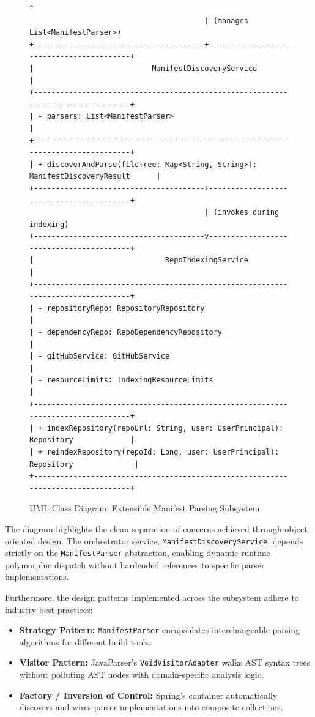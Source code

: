 \documentclass[11pt,a4paper,openany]{report}
\begin{document}
\begin{figure}[htbp]
\begin{lstlisting}[style=asciistyle, rulecolor=\color{secondary}]
                                        ^
                                        | (manages List<ManifestParser>)
+---------------------------------------+-----------------------------------------+
|                           ManifestDiscoveryService                              |
+---------------------------------------------------------------------------------+
| - parsers: List<ManifestParser>                                                 |
+---------------------------------------------------------------------------------+
| + discoverAndParse(fileTree: Map<String, String>): ManifestDiscoveryResult      |
+---------------------------------------+-----------------------------------------+
                                        | (invokes during indexing)
+---------------------------------------v-----------------------------------------+
|                              RepoIndexingService                                |
+---------------------------------------------------------------------------------+
| - repositoryRepo: RepositoryRepository                                          |
| - dependencyRepo: RepoDependencyRepository                                      |
| - gitHubService: GitHubService                                                  |
| - resourceLimits: IndexingResourceLimits                                        |
+---------------------------------------------------------------------------------+
| + indexRepository(repoUrl: String, user: UserPrincipal): Repository             |
| + reindexRepository(repoId: Long, user: UserPrincipal): Repository              |
+---------------------------------------------------------------------------------+
\end{lstlisting}
\caption{UML Class Diagram: Extensible Manifest Parsing Subsystem}
\label{fig:uml-diagram}
\end{figure}

The diagram highlights the clean separation of concerns achieved through object-oriented design. The orchestrator service, \texttt{ManifestDiscoveryService}, depends strictly on the \texttt{ManifestParser} abstraction, enabling dynamic runtime polymorphic dispatch without hardcoded references to specific parser implementations.

Furthermore, the design patterns implemented across the subsystem adhere to industry best practices:
\begin{itemize}[leftmargin=1.2cm]
    \item \textbf{Strategy Pattern:} \texttt{ManifestParser} encapsulates interchangeable parsing algorithms for different build tools.
    \item \textbf{Visitor Pattern:} JavaParser's \texttt{VoidVisitorAdapter} walks AST syntax trees without polluting AST nodes with domain-specific analysis logic.
    \item \textbf{Factory / Inversion of Control:} Spring's container automatically discovers and wires parser implementations into composite collections.
\end{itemize}
\end{document}

